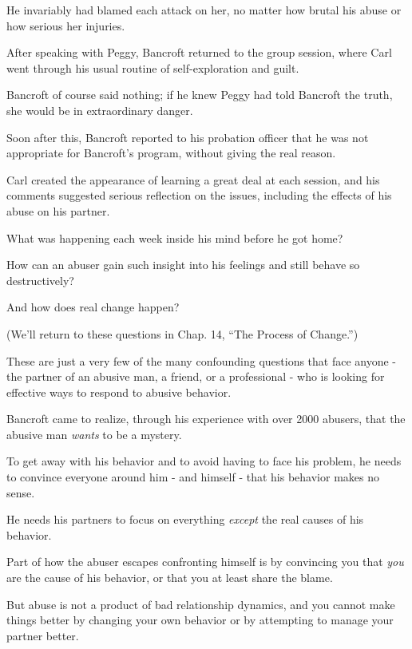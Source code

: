 \documentclass[oneside]{article}
\numberwithin{equation}{section}
\begin{document}
He invariably had blamed each attack on her, no matter how brutal his abuse or how serious her injuries.

%
After speaking with Peggy, Bancroft returned to the group session, where Carl went through his usual routine of self-exploration and guilt.

Bancroft of course said nothing; if he knew Peggy had told Bancroft the truth, she would be in extraordinary danger.

Soon after this, Bancroft reported to his probation officer that he was not appropriate for Bancroft's program, without giving the real reason.

%
Carl created the appearance of learning a great deal at each session, and his comments suggested serious reflection on the issues, including the effects of his abuse on his partner.

What was happening each week inside his mind before he got home?

How can an abuser gain such insight into his feelings and still behave so destructively?

And how does real change happen?

(We'll return to these questions in Chap. 14, ``The Process of Change.'')

%
These are just a very few of the many confounding questions that face anyone - the partner of an abusive man, a friend, or a professional - who is looking for effective ways to respond to abusive behavior.

Bancroft came to realize, through his experience with over 2000 abusers, that the abusive man \textit{wants} to be a mystery.

To get away with his behavior and to avoid having to face his problem, he needs to convince everyone around him - and himself - that his behavior makes no sense.

He needs his partners to focus on everything \textit{except} the real causes of his behavior.



%
Part of how the abuser escapes confronting himself is by convincing you that \textit{you} are the cause of his behavior, or that you at least share the blame.

But abuse is not a product of bad relationship dynamics, and you cannot make things better by changing your own behavior or by attempting to manage your partner better.
\end{document}
